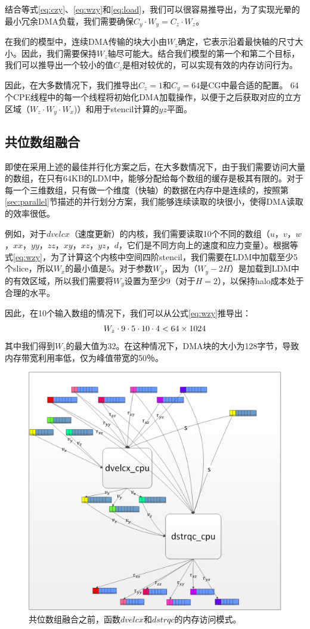 \documentclass[degree=doctor]{thuthesis}
\begin{document}
结合等式\ref{eq:czy}、\ref{eq:wzy}和\ref{eq:load}，我们可以很容易推导出，为了实现光晕的最小冗余DMA负载，我们需要确保$C_y\cdot W_y = C_z\cdot W_z $。



在我们的模型中，连续DMA传输的块大小由$ W_z $确定，它表示沿着最快轴的尺寸大小。因此，我们需要保持$ W_z $轴尽可能大。结合我们模型的第一个和第二个目标，我们可以推导出一个较小的值$ C_z $是相对较优的，可以实现有效的内存访问行为。

因此，在大多数情况下，我们推导出$ C_z = 1 $和$ C_y = 64 $是CG中最合适的配置。 64个CPE线程中的每一个线程将初始化DMA加载操作，以便于之后获取对应的立方区域（$W_z \cdot W_y \cdot W_x$)）和用于stencil计算的$ yz $平面。

\subsection{共位数组融合}
即使在采用上述的最佳并行化方案之后，在大多数情况下，由于我们需要访问大量的数组，在只有64KB的LDM中，能够分配给每个数组的缓存是极其有限的。对于每一个三维数组，只有做一个维度（快轴）的数据在内存中是连续的，按照第\ref{sec:parallel}节描述的并行划分方案，我们能够连续读取的块很小，使得DMA读取的效率很低。

例如，对于$ dvelcx $（速度更新）的内核，我们需要读取10个不同的数组（$ u $，$ v $，$ w $，$ xx $，$ yy $，$ zz $，$ xy $，$ xz $，$ yz $，$ d $，它们是不同方向上的速度和应力变量）。根据等式\ref {eq:wzy}，为了计算这个内核中空间四阶stencil，我们需要在LDM中加载至少5个slice，所以$ W_x $的最小值是5。对于参数$ W_y $，因为$（W_y-2H）$是加载到LDM中的有效区域，所以我们需要将$ W_y $设置为至少9（对于$ H = 2 $），以保持halo成本处于合理的水平。

因此，在10个输入数组的情况下，我们可以从公式\ref{eq:wzy}推导出：
\begin{equation}
W_z \cdot 9 \cdot 5 \cdot 10 \cdot 4 < 64 \times 1024\\
\label{eq:wzy1}
\end{equation}
其中我们得到$ W_z $的最大值为32。在这种情况下，DMA块的大小为128字节，导致内存带宽利用率低，仅为峰值带宽的50％。
\begin{figure}[ht]
\centering
\includegraphics[width=0.7\columnwidth]{awp_before.png}
\caption{共位数组融合之前，函数$dvelcx$和$dstrqc$的内存访问模式。}
\label{fig:array-fusion-before}
\end{figure}
\end{document}
